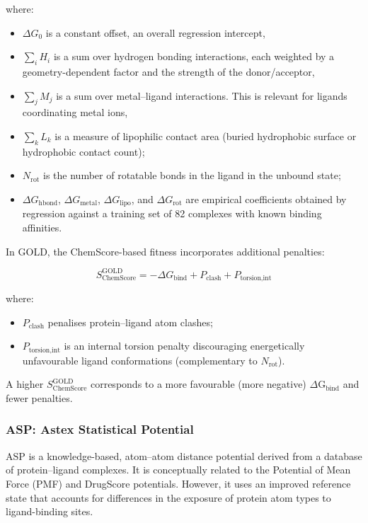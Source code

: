 \documentclass[12pt]{article}
\begin{document}
where:
\begin{itemize}
    \item $\Delta G_{0}$ is a constant offset, an overall regression intercept,
    \item $\sum_{i} H_{i}$ is a sum over hydrogen bonding interactions, each weighted by a geometry-dependent factor and the strength of the donor/acceptor,
    \item $\sum_{j} M_{j}$ is a sum over metal–ligand interactions. This is relevant for ligands coordinating metal ions,
    \item $\sum_{k} L_{k}$ is a measure of lipophilic contact area (buried hydrophobic surface or hydrophobic contact count);
    \item $N_{\textrm{rot}}$ is the number of rotatable bonds in the ligand in the unbound state;
    \item $\Delta G_{\textrm{hbond}}$, $\Delta G_{\textrm{metal}}$, $\Delta G_{\textrm{lipo}}$, and $\Delta G_{\textrm{rot}}$ are empirical coefficients obtained by regression against a training set of 82 complexes with known binding affinities\cite{CH7_Eldridge1997}.
\end{itemize}

In GOLD, the ChemScore-based fitness\cite{CH7_Wang2003_Suppl} incorporates additional penalties:

\begin{equation}
S_{\textrm{ChemScore}}^{\textrm{GOLD}}
=
-\Delta G_{\textrm{bind}}
+
P_{\textrm{clash}}
+
P_{\textrm{torsion,int}}
\end{equation}

where:
\begin{itemize}
    \item $P_{\textrm{clash}}$ penalises protein–ligand atom clashes;
    \item $P_{\textrm{torsion,int}}$ is an internal torsion penalty discouraging energetically unfavourable ligand conformations (complementary to $N_{\textrm{rot}}$).
\end{itemize}
A higher $S_{\textrm{ChemScore}}^{\textrm{GOLD}}$ corresponds to a more favourable (more negative) $\Delta \textrm{G}_{\textrm{bind}}$ and fewer penalties.

\subsubsection{ASP: Astex Statistical Potential}
ASP is a knowledge-based, atom–atom distance potential derived from a database of protein–ligand complexes\cite{CH7_Mooij2005}. It is conceptually related to the Potential of Mean Force (PMF) and DrugScore potentials. However, it uses an improved reference state that accounts for differences in the exposure of protein atom types to ligand-binding sites\cite{CH7_Mooij2005}.
\end{document}
